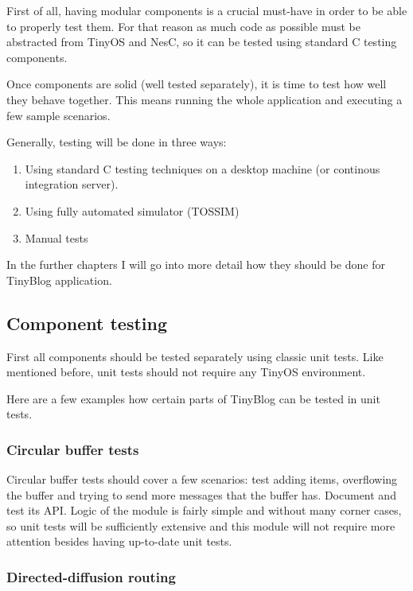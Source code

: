 \documentclass[english,11pt]{article}
\numberwithin{equation}{section}
\begin{document}
First of all, having modular components is a crucial must-have in order to be
able to properly test them. For that reason as much code as possible must be
abstracted from TinyOS and NesC, so it can be tested using standard C testing
components.

Once components are solid (well tested separately), it is time to test how well
they behave together. This means running the whole application and executing a
few sample scenarios.

Generally, testing will be done in three ways:
\begin{enumerate}
    \item Using standard C testing techniques on a desktop machine (or continous
        integration server).
    \item Using fully automated simulator (TOSSIM)
    \item Manual tests
\end{enumerate}

In the further chapters I will go into more detail how they should be done for
TinyBlog application.

\subsection{Component testing}

First all components should be tested separately using classic unit tests. Like
mentioned before, unit tests should not require any TinyOS environment.

Here are a few examples how certain parts of TinyBlog can be tested in unit
tests.

\subsubsection{Circular buffer tests}

Circular buffer tests should cover a few scenarios: test adding items,
overflowing the buffer and trying to send more messages that the buffer has.
Document and test its API. Logic of the module is fairly simple and without many
corner cases, so unit tests will be sufficiently extensive and this module will
not require more attention besides having up-to-date unit tests.

\subsubsection{Directed-diffusion routing}
\end{document}
